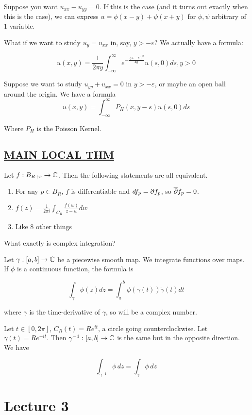 \documentclass[x11names,reqno,14pt]{extarticle}
\newcommand{\oo}{{\infty}}
\begin{document}
Suppose you want $u_{xx} - u_{yy} = 0$. If this is the case (and it turns out exactly when this is the case), we can express $u = \phi(x - y) + \psi(x + y)$ for $\phi, \psi$ arbitrary of $1$ variable. 

What if we want to study $u_y = u_{xx}$ in, say, $y > -\varepsilon$? We actually have a formula:

\[
u(x, y) = \frac{1}{2\pi y}\int_{-\oo}^{\oo} e^{-\frac{(x - s)^2}{4y}}u(s, 0)ds, y > 0
\]

Suppose we want to study $u_{yy} + u_{xx} = 0$ in $y > -\varepsilon$, or maybe an open ball around the origin. We have a formula
\[
u(x, y) = \int_{-\oo}^\oo P_H(x, y - s)u(s, 0)ds
\]

Where $P_H$ is the Poisson Kernel. 

\subsection*{\underline{MAIN LOCAL THM}}
Let $f:B_{R + \varepsilon}\to \mathbb{C}$. Then the following statements are all equivalent. 
\begin{enumerate}
\item For any $p \in B_R$, $f$ is differentiable and $df_p = \partial f_p$, so $\overline{\partial}f_p = 0$.
\item $f(z) = \frac{1}{2\pi i}\int_{C_R}\frac{f(w)}{z - w}dw$
\item Like 8 other things
\end{enumerate}

What exactly is complex integration? 

Let $\gamma:[a, b]\to\mathbb{C}$ be a piecewise smooth map. We integrate functions over maps. If $\phi$ is a continuous function, the formula is 

\[
\int_\gamma\phi(z)dz = \int_a^b\phi(\gamma(t))\dot{\gamma}(t)dt
\]

where $\dot{\gamma}$ is the time-derivative of $\gamma$, so will be a complex number. 

Let $t \in [0, 2\pi]$, $C_R(t) = Re^{it}$, a circle going counterclockwise. Let $\gamma(t) = Re^{-it}$. Then $\gamma^{-1}:[a, b]\to\mathbb{C}$ is the same but in the opposite direction. We have

\[
\int_{\gamma^{-1}}\phi\,dz = \int_{\gamma}\phi\,dz
\]

\section*{Lecture 3}
\end{document}
